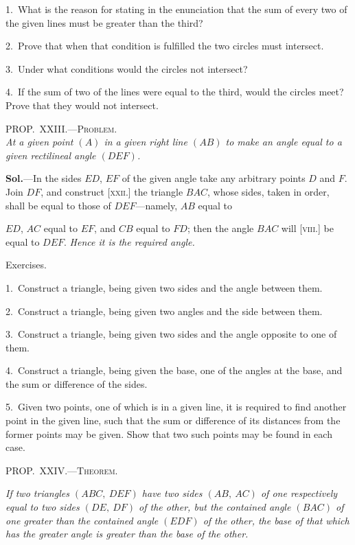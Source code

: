 \documentclass[oneside]{book}
\newcommand\myprop[2]{
\bigskip\Needspace*{4\baselineskip}\begin{center}\textsc{#1}\\\medskip\emph{#2}\par\end{center}
}
\newcommand\mypropl[2]{
\bigskip\Needspace*{4\baselineskip}\begin{center}\textsc{#1}\end{center}
\hspace{\parindent}\emph{#2}\par\medskip
}
\newcommand\exhead[1]{
\Needspace*{5\baselineskip}\begin{center}
\textsf{#1}
\end{center}
}
\newcommand\imgcent[2]{
\begin{center}

\end{center}
}
\begin{document}
\begin{footnotesize}
1.~What is the reason for stating in the enunciation that the
sum of every two of the given lines must be greater than the
third?

2.~Prove that when that condition is fulfilled the two circles
must intersect.

3.~Under what conditions would the circles not intersect?

4.~If the sum of two of the lines were equal to the third, would
the circles meet? Prove that they would not intersect.
\par\end{footnotesize}


\myprop{PROP\@.~XXIII\@.---Problem.}{At a given point $(A)$ in a given right line $(AB)$ to make
an angle equal to a given rectilineal angle $(DEF)$.}


\imgcent{270}{f040}

\textbf{Sol.}---In the sides $ED$, $EF$ of the given angle take
any arbitrary points $D$ and $F$. Join $DF$, and construct
[\textsc{xxii}.] the triangle $BAC$, whose sides, taken in order,
shall be equal to those of $DEF$---namely, $AB$ equal to

$ED$, $AC$ equal to $EF$, and $CB$ equal to $FD$; then the
angle $BAC$ will [\textsc{viii}.] be equal to $DEF$. \textit{Hence it is
the required angle.}


\exhead{Exercises.}

\begin{footnotesize}
1.~Construct a triangle, being given two sides and the angle
between them.

2.~Construct a triangle, being given two angles and the side
between them.

3.~Construct a triangle, being given two sides and the angle
opposite to one of them.

4.~Construct a triangle, being given the base, one of the angles
at the base, and the sum or difference of the sides.

5.~Given two points, one of which is in a given line, it is required
to find another point in the given line, such that the sum
or difference of its distances from the former points may be given.
Show that two such points may be found in each case.
\par\end{footnotesize}


\mypropl{PROP\@.~XXIV\@.---Theorem.}{If two triangles $(ABC,\ DEF)$ have two sides $(AB,\ AC)$
of one respectively equal to two sides $(DE,\ DF)$ of the
other, but the contained angle $(BAC)$ of one greater than
the contained angle $(EDF)$ of the other, the base of that
which has the greater angle is greater than the base of the
other.}
\end{document}
